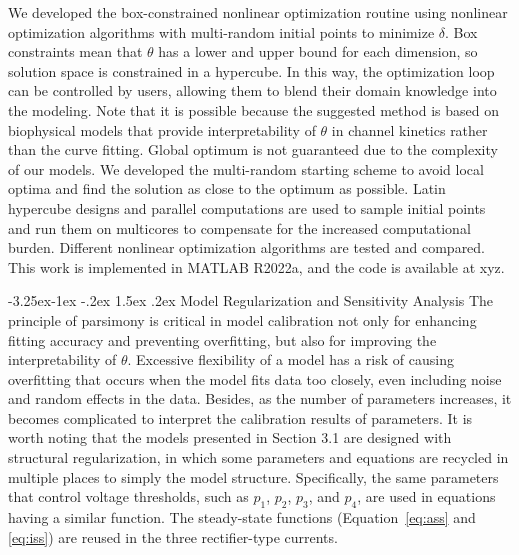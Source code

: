 \documentclass[11pt]{article}
\makeatletter
\renewcommand\subsection{\@startsection{subsection}{2}{\z@}%
                                     {-3.25ex\@plus -1ex \@minus -.2ex}%
                                     {1.5ex \@plus .2ex}%
                                     {\normalfont\fontfamily{phv}\fontsize{14}{17}\bfseries}}
\makeatother
\begin{document}
We developed the box-constrained nonlinear optimization routine using nonlinear optimization algorithms with multi-random initial points to minimize $\delta$. Box constraints mean that $\theta$ has a lower and upper bound for each dimension, so solution space is constrained in a hypercube. In this way, the optimization loop can be controlled by users, allowing them to blend their domain knowledge into the modeling. Note that it is possible because the suggested method is based on biophysical models that provide interpretability of $\theta$ in channel kinetics rather than the curve fitting. Global optimum is not guaranteed due to the complexity of our models. We developed the multi-random starting scheme to avoid local optima and find the solution as close to the optimum as possible. Latin hypercube designs and parallel computations are used to sample initial points and run them on multicores to compensate for the increased computational burden. Different nonlinear optimization algorithms are tested and compared. This work is implemented in MATLAB R2022a, and the code is available at xyz.

\subsection{Model Regularization and Sensitivity Analysis}
The principle of parsimony is critical in model calibration not only for enhancing fitting accuracy and preventing overfitting, but also for improving the interpretability of $\theta$. Excessive flexibility of a model has a risk of causing overfitting that occurs when the model fits data too closely, even including noise and random effects in the data. Besides, as the number of parameters increases, it becomes complicated to interpret the calibration results of parameters. It is worth noting that the models presented in Section 3.1 are designed with structural regularization, in which some parameters and equations are recycled in multiple places to simply the model structure. Specifically, the same parameters that control voltage thresholds, such as $p_{1}$, $p_{2}$, $p_{3}$, and $p_{4}$, are used in equations having a similar function. The steady-state functions (Equation~\ref{eq:ass} and \ref{eq:iss}) are reused in the three rectifier-type currents. 
\end{document}
